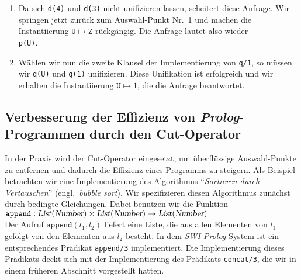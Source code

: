\begin{enumerate}
\item Da sich \texttt{d(4)} und \texttt{d(3)} nicht unifizieren lassen,
      scheitert diese Anfrage.  Wir springen jetzt zurück zum Auswahl-Punkt Nr.~1 und
      machen die Instantiierung $\mathtt{U} \mapsto \mathtt{Z}$ rückgängig.  Die Anfrage
      lautet also wieder \\[0.1cm]
      \hspace*{1.3cm} \texttt{p(U)}.
\item Wählen wir nun die zweite Klausel der Implementierung von \texttt{q/1},
      so müssen wir \texttt{q(U)} und \texttt{q(1)} unifizieren.  Diese Unifikation ist
      erfolgreich und wir erhalten die Instantiierung $\mathtt{U} \mapsto 1$, die die Anfrage beantwortet.
\end{enumerate}

\subsection{Verbesserung der Effizienz von \textsl{Prolog}-Programmen durch den Cut-Operator}
In der Praxis wird der Cut-Operator eingesetzt, um überflüssige Auswahl-Punkte zu
entfernen und dadurch die Effizienz eines Programms zu steigern.  Als Beispiel
betrachten wir eine Implementierung des Algorithmus 
``\emph{Sortieren durch Vertauschen}'' (engl.~\emph{bubble sort}).
Wir spezifizieren diesen Algorithmus zunächst durch bedingte Gleichungen.  Dabei 
benutzen wir die Funktion \\[0.1cm]
\hspace*{1.3cm} 
$\texttt{append}: \textsl{List}(\textsl{Number}) \times \textsl{List}(\textsl{Number}) \rightarrow \textsl{List}(\textsl{Number})$
\\[0.1cm]
Der Aufruf $\texttt{append}(l_1, l_2)$ liefert eine Liste, die aus allen Elementen von
$l_1$ gefolgt von den Elementen aus $l_2$ besteht.  In dem \textsl{SWI-Prolog}-System ist
ein entsprechendes Prädikat \texttt{append/3} implementiert.  Die Implementierung dieses
Prädikats deckt sich mit der Implementierung des Prädikats \texttt{concat/3}, die wir in
einem früheren Abschnitt vorgestellt hatten.  


